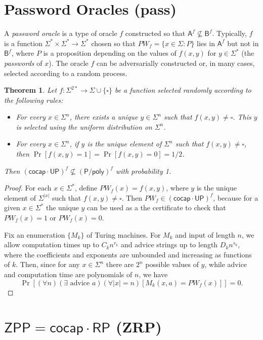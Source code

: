 \documentclass[12pt]{article}
\newtheorem{theorem}{Theorem}[section]
\theoremstyle{definition}
\theoremstyle{remark}
\newcommand{\ra}{\rightarrow}
\newcommand{\A}{\mathsf{A}}
\newcommand{\cocap}{\mathsf{cocap}}
\newcommand{\sP}{\mathsf{P}}
\newcommand{\poly}{\mathsf{poly}}
\newcommand{\msf}[1]{\mathsf{#1}}
\begin{document}
\section{Password Oracles (pass)}

A \textit{password oracle} is a type of oracle $f$ constructed so that
$\A^f\not\subseteq\msf{B}^f$. Typically, $f$ is a function
$\Sigma^*\times\Sigma^*\rightarrow\Sigma^*$ chosen so that
$PW_f=\{x\in\Sigma:P\}$ lies in $\A^f$ but not in $\msf{B}^f$, where $P$ is a
proposition depending on the values of $f(x,y)$ for $y\in\Sigma^*$ (the
\textit{passwords} of $x$). The oracle $f$ can be adversarially constructed or,
in many cases, selected according to a random process.

\begin{theorem}
Let $f:\Sigma^{2*}\ra\Sigma\cup\{\square\}$ be a function selected randomly
according to the following rules:
\begin{itemize}
\item For every $x\in\Sigma^n$, there exists a unique $y\in\Sigma^n$ such that
$f(x,y)\neq\square$. This $y$ is selected using the uniform distribution on
$\Sigma^n$.
\item  For every $x\in\Sigma^n$, if $y$ is the unique element of $\Sigma^n$ such
that $f(x,y)\neq\square$, then $\Pr[f(x,y)=1]=\Pr[f(x,y)=0]=1/2$.
\end{itemize}
Then $(\cocap\cdot\msf{UP})^f\not\subseteq(\sP/\poly)^f$ with probability 1.
\end{theorem}

\begin{proof}
For each $x\in\Sigma^*$, define $PW_f(x)=f(x,y)$, where $y$ is the unique
element of $\Sigma^{|x|}$ such that $f(x,y)\neq\square$. Then
$PW_f\in(\cocap\cdot\msf{UP})^f$, because for a given $x\in\Sigma^*$ the unique
$y$ can be used as a the certificate to check that $PW_f(x)=1$ or $PW_f(x)=0$.

Fix an enumeration $\{M_k\}$ of Turing machines. For $M_k$ and input of length
$n$, we allow computation times up to $C_kn^{r_k}$ and advice strings up to
length $D_kn^{s_k}$, where the coefficients and exponents are unbounded and
increasing as functions of $k$. Then, since for any $x\in\Sigma^n$ there are
$2^n$ possible values of $y$, while advice and computation time are polynomials
of $n$, we have
\[
\Pr[(\forall n)(\exists\text{ advice }a)(\forall|x|=n)[M_k(x,a)=PW_f(x)]]=0.
\]
\end{proof}

\section{$\msf{ZPP} = \cocap\cdot\msf{RP}$ (ZRP)}
\end{document}
